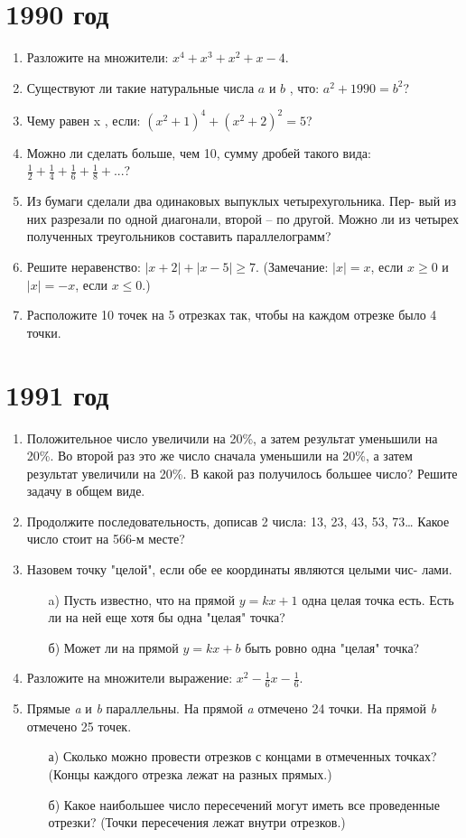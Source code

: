\documentclass[12pt]{article}
\begin{document}
\section* {1990 год}
\begin{enumerate}
    \item Разложите на множители:
$x^4+x^3+x^2+x-4$.
    \item Существуют ли такие натуральные числа $a$ и $b$ , что: $a^2 + 1990 = b^2$?
    \item Чему равен x , если: $(x^2+1)^4+(x^2+2)^2=5$?
    \item Можно ли сделать больше, чем 10, сумму дробей такого вида: $\frac12 + \frac14 + \frac16 + \frac18 + $...?
    \item Из бумаги сделали два одинаковых выпуклых четырехугольника. Пер-
вый из них разрезали по одной диагонали, второй – по другой. Можно
ли из четырех полученных треугольников составить параллелограмм?
    \item Решите неравенство: $|x+2| + |x-5|\geq7$. (Замечание: $|x|=x$, если $
    x\geq0$ и $|x|=-x$, если $x\le0$.)
    \item Расположите 10 точек на 5 отрезках так, чтобы на каждом отрезке было 4 точки. 
\end{enumerate}

\section*{1991 год}
\begin{enumerate}
\item  Положительное число увеличили на 20\%, а затем результат уменьшили
на 20\%. Во второй раз это же число сначала уменьшили на 20\%, а затем результат увеличили на 20\%. В какой раз получилось большее число? Решите задачу в общем виде.
\item Продолжите последовательность, дописав 2 числа: 13, 23, 43, 53, 73…
Какое число стоит на 566-м месте?
\item Назовем точку "целой", если обе ее координаты являются целыми чис-
лами.
\begin{enumerate}
\item[a)] Пусть известно, что на прямой $y = kx + 1$ одна целая точка есть. Есть
ли на ней еще хотя бы одна "целая" точка?
\item[б)] Может ли на прямой $y = kx + b$ быть ровно одна "целая" точка?
\end{enumerate}
\item Разложите на множители выражение:
$x^2 - \frac{1}{6}x - \frac{1}{6}$.
\item Прямые \textit{a} и \textit{b} параллельны. На прямой \textit{a} отмечено 24 точки. На прямой \textit{b} отмечено 25 точек.
\begin{enumerate}
\item[а)] Сколько можно провести отрезков с концами в отмеченных точках?
(Концы каждого отрезка лежат на разных прямых.)
\item[б)] Какое наибольшее число пересечений могут иметь все проведенные
отрезки? (Точки пересечения лежат внутри отрезков.) 
\end{enumerate}
\end{enumerate}
\end{document}
